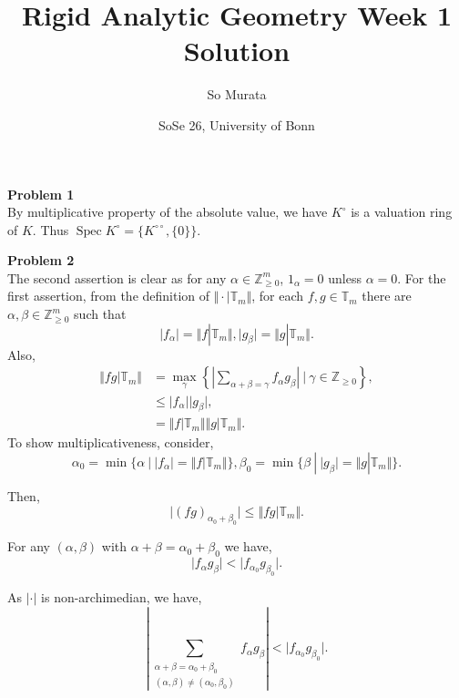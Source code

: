 \documentclass[10pt]{article}
\title{Rigid Analytic Geometry Week 1 Solution}
\author{So Murata}
\date{SoSe 26, University of Bonn}
\DeclareMathOperator{\Spec}{Spec}
\newcommand{\norm}[1]{\Vert #1 \Vert}
\newcommand{\Z}[0]{\mathbb{Z}}
\newcommand{\T}[0]{\mathbb{T}}
\newcommand{\sep}[0]{\:|\:}
\begin{document}
\maketitle

\par\textbf{Problem 1}\\
By multiplicative property of the absolute value, we have $K^\circ$ is a valuation ring of $K$. Thus $\Spec K^\circ = \{K^{\circ\circ},\{0\}\}$.
\par\textbf{Problem 2}\\
The second assertion is clear as for any $\alpha\in\Z_{\geq0}^m$, $1_\alpha=0$ unless $\alpha = 0$. For the first assertion, from the definition of $\norm{\cdot|\T_m}$, for each $f,g\in\T_m$ there are $\alpha,\beta\in\Z_{\geq0}^m$ such that 
\begin{equation}
    \vert f_\alpha\vert=\norm{f|\T_m},\vert g_\beta\vert = \norm{g|\T_m}.
\end{equation}
Also,
\begin{align*}
\norm{fg|\T_m} &= \max_\gamma\left\{\left\vert\sum_{\alpha+\beta = \gamma}f_\alpha g_\beta\right\vert\sep \gamma\in\Z_{\geq0}\right\},\\
&\leq\vert f_\alpha\vert\vert g_\beta\vert,\\
& = \norm{f|\T_m}\norm{g|\T_m}.
\end{align*}
To show multiplicativeness, consider,
\begin{equation*}
  \alpha_0 = \min\{\alpha\sep \vert f_\alpha\vert = \norm{f|\T_m}\},  \beta_0 = \min\{\beta\sep \vert g_\beta\vert = \norm{g|\T_m}\}.
\end{equation*}

Then,
\begin{equation*}
  \vert (fg)_{\alpha_0+\beta_0}\vert \leq \norm{fg|\T_m}.
\end{equation*}

For any $(\alpha,\beta)$ with $\alpha+\beta = \alpha_0+\beta_0$ we have,
\begin{equation*}
  \vert f_\alpha g_\beta\vert <\vert f_{\alpha_0}g_{\beta_0}\vert.
\end{equation*}

As $\vert\cdot\vert$ is non-archimedian, we have,
\begin{equation*}
  \left\vert\sum_{\substack{\alpha+\beta=\alpha_0+\beta_0\\(\alpha,\beta)\not=(\alpha_0,\beta_0)}}f_\alpha g_\beta\right\vert <\vert f_{\alpha_0}g_{\beta_0}\vert.
\end{equation*}
\end{document}
